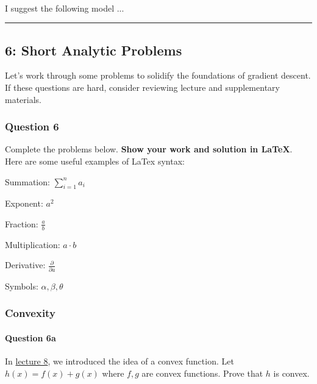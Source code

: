 \documentclass[11pt]{article}
\begin{document}
    \begin{center}
    \end{center}
    { \hspace*{\fill} \\}
    
    I suggest the following model ...

    \begin{center}\rule{0.5\linewidth}{\linethickness}\end{center}

\subsection{6: Short Analytic Problems}\label{short-analytic-problems}

Let's work through some problems to solidify the foundations of gradient
descent. If these questions are hard, consider reviewing lecture and
supplementary materials.

\subsubsection{Question 6}\label{question-6}

Complete the problems below. \textbf{Show your work and solution in
LaTeX}. Here are some useful examples of LaTex syntax:

Summation: \(\sum_{i=1}^n a_i\)

Exponent: \(a^2\)

Fraction: \(\frac{a}{b}\)

Multiplication: \(a \cdot b\)

Derivative: \(\frac{\partial}{\partial a}\)

Symbols: \(\alpha, \beta, \theta\)

    \subsubsection{Convexity}\label{convexity}

\paragraph{Question 6a}\label{question-6a}

In \href{http://www.ds100.org/fa18/syllabus\#lecture-week-5}{lecture 8},
we introduced the idea of a convex function. Let \(h(x) = f(x) + g(x)\)
where \(f,g\) are convex functions. Prove that \(h\) is convex.
\end{document}
